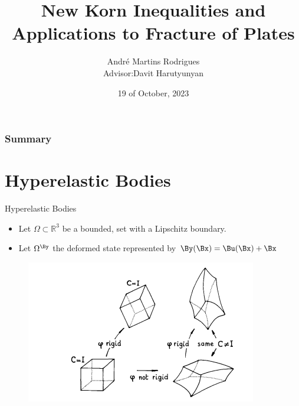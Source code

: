 \documentclass{beamer}
\title[New Korn Inequalities]{\huge{New Korn Inequalities and Applications to Fracture of Plates}}
\author[Andre]{André Martins Rodrigues \\ Advisor:Davit Harutyunyan}
\institute[UCSB]{University of California Santa Barbara}
\date{19 of October, 2023}
\newcommand{\bul}{{\color{structure}\textbullet}}
\begin{document}
\begin{frame}[plain]
	\titlepage
\end{frame}
\begin{frame}[plain]
	\frametitle{Summary}
	\tableofcontents
\end{frame}




\section{Hyperelastic Bodies}
\begin{frame}{Hyperelastic Bodies}
    \begin{itemize}
        \item[\bul] Let $\Omega\subset\mathbb{R}^3$ be a bounded, set with a Lipschitz boundary.
        \vfill
        \item[\bul] Let $\Omega^\By$ the deformed state represented by $\By (\Bx) = \Bu(\Bx) + \Bx$
    \end{itemize}    
    \begin{figure}
        \includegraphics[scale=1]{figures/rigid.png}
    \end{figure}
    \end{frame}
    
\end{document}
